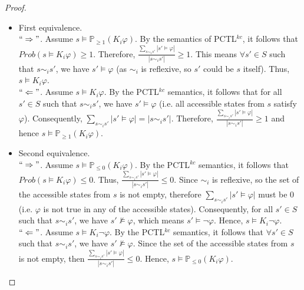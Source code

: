 \begin{proof} \hspace{-0.9cm}

\begin{itemize}
\item First equivalence. ~\\
    $``\Rightarrow"$. Assume $s\models \mathbb{P}_{\geq1} (K_i\varphi)$.
    By the semantics of PCTL$^{kc}$, it follows that $Prob(s\models K_i\varphi)\geq1$.
    Therefore, $\frac{\sum_{s\sim_i s'}|s'\models \varphi| }{|s\sim_i s'|}\geq1$. This means $\forall s'\in S$ such that $s\sim_i s'$, we have
    $s'\models \varphi$ (as $\sim_i$ is reflexive, so $s'$ could be $s$ itself). Thus, $s \models K_i \varphi$. \\
    $``\Leftarrow"$. Assume $s\models K_i\varphi$. By the PCTL$^{kc}$ semantics, it follows that for all $s'\in S$ such that $s\sim_i s'$,
    we have $s'\models \varphi$ (i.e. all accessible states from $s$ satisfy $\varphi$).
    Consequently, $\sum_{s\sim_i s'}|s'\models \varphi| = |s\sim_i s'|$.
    Therefore, $\frac{\sum_{s\sim_i s'}|s'\models \varphi| }{|s\sim_i s'|}\geq1$ and hence $s\models \mathbb{P}_{\geq1} (K_i\varphi)$.

\item Second equivalence. ~\\
    $``\Rightarrow"$. Assume $s\models \mathbb{P}_{\leq0} (K_i\varphi)$.
    By the PCTL$^{kc}$ semantics, it follows that $Prob(s\models K_i\varphi)\leq0$.
    Thus, $\frac{\sum_{s\sim_i s'}|s'\models \varphi|}{|s\sim_i s'|}\leq0$. Since $\sim_i$ is reflexive, so the set of the accessible states from $s$ is not empty, therefore $\sum_{s\sim_i s'}|s'\models \varphi|$ must be 0 (i.e. $\varphi$ is not true in any of the accessible states). Consequently, for all $s'\in S$ such that $s\sim_i s'$, we have $s'\nvDash \varphi$, which means $s'\vDash \neg \varphi$. Hence, $s\models K_i \neg \varphi$.~\\
%
    $``\Leftarrow"$. Assume $s\models K_i\neg \varphi$. By the PCTL$^{kc}$ semantics, it follows that $\forall s'\in S$ such that
    $s\sim_i s'$, we have $s'\nvDash \varphi$. Since the set of the accessible states from $s$ is not empty, then $\frac{\sum_{s\sim_i s'}|s'\models \varphi| }{|s\sim_i s'|}\leq0$.
    Hence, $s\models \mathbb{P}_{\leq0} (K_i\varphi)$.


\end{itemize}
\end{proof}
